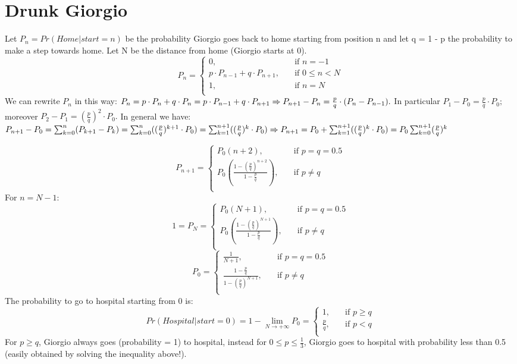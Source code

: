 \section{Drunk Giorgio}
Let $P_n = Pr(Home | start = n)$ be the probability Giorgio goes back to home starting from position n and let q = 1 - p the probability to make a step towards home. Let N be the distance from home (Giorgio starts at 0).
\[   
P_n = 
\begin{cases}
0, &\quad\text{if } n = -1\\
p \cdot P_{n-1} + q \cdot P_{n+1}, &\quad\text{if } 0 \leq n < N\\
1, &\quad\text{if } n = N\\
\end{cases}
\]
We can rewrite $P_n$ in this way:
$
P_n = p \cdot P_n + q \cdot P_n = p \cdot P_{n-1} + q \cdot P_{n+1}
\newline \Rightarrow P_{n+1} - P_n = \frac{p}{q} \cdot (P_n - P_{n-1}).
\newline$
In particular $P_1 - P_0 = \frac{p}{q} \cdot P_0;$ moreover $P_2 - P_1 = (\frac{p}{q})^2 \cdot P_0.$
In general we have: $P_{n+1} - P_0 = \sum_{k=0}^{n} (P_{k+1} - P_k) = \sum_{k=0}^{n} ((\frac{p}{q})^{k+1} \cdot P_0) = \sum_{k=1}^{n+1} ((\frac{p}{q})^{k} \cdot P_0)
\newline \Rightarrow P_{n+1} = P_0 + \sum_{k=1}^{n+1} ((\frac{p}{q})^{k} \cdot P_0) = P_0\sum_{k=0}^{n+1} (\frac{p}{q})^{k}$

\[   
P_{n+1} = 
\begin{cases}
P_0 (n+2), &\quad\text{if } p = q = 0.5\\
P_0 (\frac{1-(\frac{p}{q})^{n+2}}{1-\frac{p}{q}}), &\quad\text{if } p \neq q\\
\end{cases}
\]
For $n = N -1$:
\[   
1 = P_N = 
\begin{cases}
P_0 (N+1), &\quad\text{if } p = q = 0.5\\
P_0 (\frac{1-(\frac{p}{q})^{N+1}}{1-\frac{p}{q}}), &\quad\text{if } p \neq q\\
\end{cases}
\]
\[   
P_0 = 
\begin{cases}
\frac{1}{N+1}, &\quad\text{if } p = q = 0.5\\
\frac{1-\frac{p}{q}}{1-(\frac{p}{q})^{N+1}}, &\quad\text{if } p \neq q\\
\end{cases}
\]
The probability to go to hospital starting from 0 is:
\[   
Pr(Hospital | start = 0) = 1 - \lim_{N \to +\infty} P_0 =
\begin{cases}
1, &\quad\text{if } p \geq q\\
\frac{p}{q}, &\quad\text{if } p < q\\
\end{cases}
\]
For $p \geq q$, Giorgio always goes (probability = 1) to hospital, instead for $0 \leq p \leq \frac{1}{3}$, Giorgio goes to hospital with probability less than 0.5 (easily obtained by solving the inequality above!).